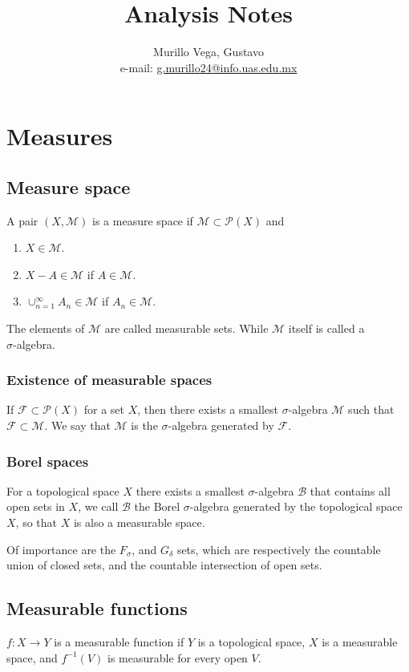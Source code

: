 \documentclass[oneside]{book}
\title{Analysis Notes}
\author{Murillo Vega, Gustavo \\ e-mail:
\href{mailto:g.murillo24@info.uas.edu.mx}{g.murillo24@info.uas.edu.mx}}
\begin{document}
\maketitle

\chapter{Measures}
\section{Measure space}
A pair $(X,\mathcal{M})$ is a measure space if
$\mathcal{M}\subset \mathcal{P}(X)$ and
\begin{enumerate}
    \item $X\in\mathcal{M}$.
    \item $X-A\in\mathcal{M}$ if $A\in\mathcal{M}$.
    \item $\cup^\infty_{n=1}A_n\in\mathcal{M}$ if
    $A_n\in\mathcal{M}$.
\end{enumerate}
The elements of $\mathcal{M}$ are called measurable sets.
While $\mathcal{M}$ itself is called a\\$\sigma$-algebra.

\subsection{Existence of measurable spaces}
If $\mathcal{F}\subset \mathcal{P}(X)$ for a set $X$, then
there exists a smallest $\sigma$-algebra $\mathcal{M}$ such
that $\mathcal{F}\subset\mathcal{M}$. We say that
$\mathcal{M}$ is the $\sigma$-algebra generated by $\mathcal{F}$.

\subsection{Borel spaces}
For a topological space $X$ there exists a smallest
$\sigma$-algebra $\mathcal{B}$ that contains all open sets in 
$X$, we call $\mathcal{B}$ the Borel $\sigma$-algebra
generated by the topological space $X$, so that $X$ is also
a measurable space.

Of importance are the $F_\sigma$, and $G_\delta$ sets,
which are respectively the countable union of closed
sets, and the countable intersection of open sets.

\section{Measurable functions}
$f:X\rightarrow Y$ is a measurable function if $Y$ is a
topological space, $X$ is a measurable space,
and $f^{-1}(V)$ is measurable for every open $V$.
\end{document}
